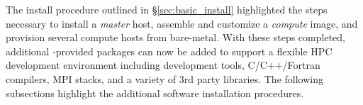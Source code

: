 The install procedure outlined in \S\ref{sec:basic_install} highlighted the
steps necessary to install a {\em master} host, assemble and customize a {\em
  compute} image, and provision several compute hosts from bare-metal. With
these steps completed, additional \OHPC{}-provided packages can now be added to
support a flexible HPC development environment including development tools,
C/C++/Fortran compilers, MPI stacks, and a variety of 3rd party libraries. The
following subsections highlight the additional software installation
procedures.
